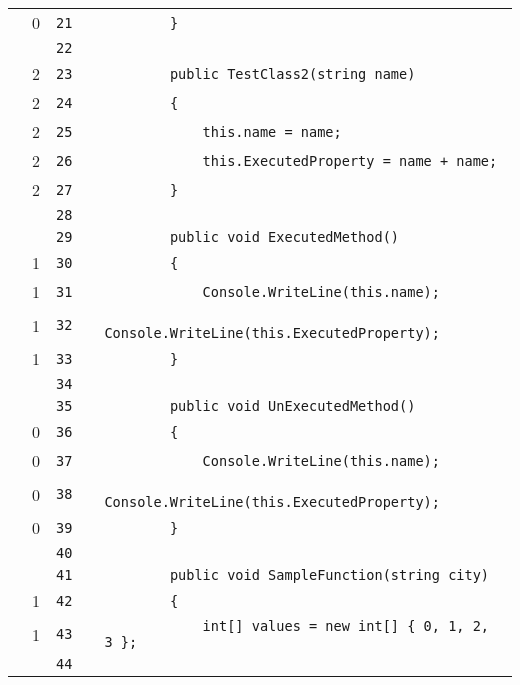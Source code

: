 \documentclass[a4paper,landscape,10pt]{article}
\begin{document}
\begin{longtable}[l]{lrrll}
\cellcolor{red} & 0 & \verb~21~ & & \verb~        }~\\
\cellcolor{gray} &  & \verb~22~ & & \verb~~\\
\cellcolor{green} & 2 & \verb~23~ & & \verb~        public TestClass2(string name)~\\
\cellcolor{green} & 2 & \verb~24~ & & \verb~        {~\\
\cellcolor{green} & 2 & \verb~25~ & & \verb~            this.name = name;~\\
\cellcolor{green} & 2 & \verb~26~ & & \verb~            this.ExecutedProperty = name + name;~\\
\cellcolor{green} & 2 & \verb~27~ & & \verb~        }~\\
\cellcolor{gray} &  & \verb~28~ & & \verb~~\\
\cellcolor{gray} &  & \verb~29~ & & \verb~        public void ExecutedMethod()~\\
\cellcolor{green} & 1 & \verb~30~ & & \verb~        {~\\
\cellcolor{green} & 1 & \verb~31~ & & \verb~            Console.WriteLine(this.name);~\\
\cellcolor{green} & 1 & \verb~32~ & & \verb~            Console.WriteLine(this.ExecutedProperty);~\\
\cellcolor{green} & 1 & \verb~33~ & & \verb~        }~\\
\cellcolor{gray} &  & \verb~34~ & & \verb~~\\
\cellcolor{gray} &  & \verb~35~ & & \verb~        public void UnExecutedMethod()~\\
\cellcolor{red} & 0 & \verb~36~ & & \verb~        {~\\
\cellcolor{red} & 0 & \verb~37~ & & \verb~            Console.WriteLine(this.name);~\\
\cellcolor{red} & 0 & \verb~38~ & & \verb~            Console.WriteLine(this.ExecutedProperty);~\\
\cellcolor{red} & 0 & \verb~39~ & & \verb~        }~\\
\cellcolor{gray} &  & \verb~40~ & & \verb~~\\
\cellcolor{gray} &  & \verb~41~ & & \verb~        public void SampleFunction(string city)~\\
\cellcolor{green} & 1 & \verb~42~ & & \verb~        {~\\
\cellcolor{green} & 1 & \verb~43~ & & \verb~            int[] values = new int[] { 0, 1, 2, 3 };~\\
\cellcolor{gray} &  & \verb~44~ & & \verb~~\\

\end{longtable}
\end{document}
